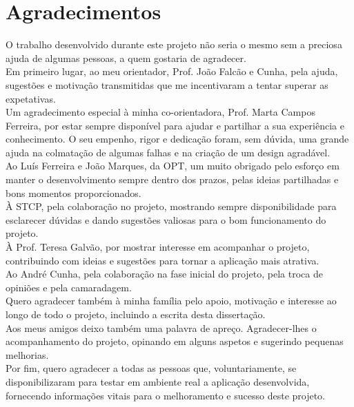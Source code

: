 \chapter*{Agradecimentos}

O trabalho desenvolvido durante este projeto não seria o mesmo sem a preciosa ajuda de algumas pessoas, a quem gostaria de agradecer.
\\Em primeiro lugar, ao meu orientador, Prof. João Falcão e Cunha, pela ajuda, sugestões e motivação transmitidas que me incentivaram a tentar superar as expetativas.
\\Um agradecimento especial à minha co-orientadora, Prof. Marta Campos Ferreira, por estar sempre disponível para ajudar e partilhar a sua experiência e conhecimento. O seu empenho, rigor e dedicação foram, sem dúvida, uma grande ajuda na colmatação de algumas falhas e na criação de um design agradável.
\\Ao Luís Ferreira e João Marques, da OPT, um muito obrigado pelo esforço em manter o desenvolvimento sempre dentro dos prazos, pelas ideias partilhadas e bons momentos proporcionados.
\\À STCP, pela colaboração no projeto, mostrando sempre disponibilidade para esclarecer dúvidas e dando sugestões valiosas para o bom funcionamento do projeto.
\\À Prof. Teresa Galvão, por mostrar interesse em acompanhar o projeto, contribuindo com ideias e sugestões para tornar a aplicação mais atrativa.
\\Ao André Cunha, pela colaboração na fase inicial do projeto, pela troca de opiniões e pela camaradagem.
\\Quero agradecer também à minha família pelo apoio, motivação e interesse ao longo de todo o projeto, incluindo a escrita desta dissertação.
\\Aos meus amigos deixo também uma palavra de apreço. Agradecer-lhes o acompanhamento do projeto, opinando em alguns aspetos e sugerindo pequenas melhorias.
\\Por fim, quero agradecer a todas as pessoas que, voluntariamente, se disponibilizaram para testar em ambiente real a aplicação desenvolvida, fornecendo informações vitais para o melhoramento e sucesso deste projeto.

\vspace{10mm}
